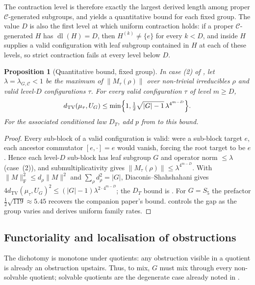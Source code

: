 \documentclass[11pt]{amsart}
\newtheorem{proposition}[proposition]{Proposition}
\theoremstyle{definition}
\theoremstyle{remark}
\theoremstyle{plain}
\theoremstyle{plain}
\numberwithin{equation}{section}
\newcommand{\norm}[1]{\lVert #1 \rVert}
\newcommand{\frob}[1]{\norm{#1}_{\mathrm{F}}}
\newcommand{\opn}[1]{\norm{#1}}
\newcommand{\dtv}{d_{\mathrm{TV}}}
\begin{document}
The contraction level is therefore exactly the largest derived length among proper
$\mathcal{C}$-generated subgroups, and yields a quantitative bound for each fixed group.
The value $D$ is also the first level at which uniform contraction holds: if a proper
$\mathcal C$-generated $H$ has $\operatorname{dl}(H)=D$, then $H^{(k)}\neq\{e\}$ for every
$k<D$, and  inside $H$ supplies a valid configuration with leaf subgroup
contained in $H$ at each of these levels, so strict contraction fails at every level below $D$.

\begin{proposition}[Quantitative bound, fixed group]
\label{prop:quant}
In case (2) of , let $\lambda=\lambda_{G,\mathcal C}<1$
be the maximum of $\opn{M_\tau(\rho)}$ over non-trivial irreducibles
$\rho$ and valid level-$D$ configurations $\tau$.
For every valid configuration $\tau$ of level $m\ge D$,
\[
 \dtv(\mu_\tau,U_G)\le
 \min\Bigl\{1,\tfrac12\sqrt{|G|-1}\,\lambda^{4^{m-D}}\Bigr\}.
\]
For the associated conditioned law $D_T$, add $p$ from
 to this bound.
\end{proposition}
\begin{proof}
Every sub-block of a valid configuration is valid: were a sub-block target $e$, each
ancestor commutator $[e,\cdot]=e$ would vanish, forcing the root target to be $e$. Hence
each level-$D$ sub-block has leaf subgroup $G$ and operator norm $\le\lambda$
(case~(2)), and submultiplicativity gives
$\opn{M_\tau(\rho)}\le\lambda^{4^{m-D}}$.
With $\frob{M}^2\le d_\rho\opn{M}^2$ and $\sum_\rho d_\rho^2=|G|$, Diaconis--Shahshahani
gives $4\dtv(\mu_\tau,U_G)^2\le(|G|-1)\lambda^{2\cdot4^{m-D}}$; the $D_T$ bound is
. For $G=S_5$ the prefactor $\tfrac12\sqrt{119}\approx5.45$
recovers the companion paper's bound. 
controls the gap as the group varies and derives uniform family rates.
\end{proof}

\subsection{Functoriality and localisation of obstructions}

The dichotomy is monotone under quotients: any obstruction visible in a quotient is already an
obstruction upstairs. Thus, to mix, $G$ must mix through every non-solvable quotient; solvable
quotients are the degenerate case already noted in .
\end{document}
